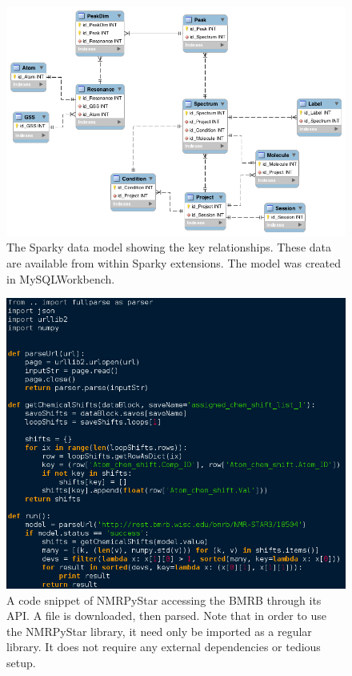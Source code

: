 \begin{figure}
  \includegraphics[scale=0.5]{figures/sparky_model}
  \caption[The Sparky data model]
          {The Sparky data model showing the key relationships.
           These data are available from within Sparky extensions.
           The model was created in MySQLWorkbench.}
  \label{sparky_model}
\end{figure}

\begin{figure}
  \includegraphics[scale=0.5]{figures/nmrpystar_bmrb}
  \caption[A code snippet of NMRPyStar]
          {A code snippet of NMRPyStar accessing the BMRB through its API.
           A file is downloaded, then parsed.  Note that in order to use
           the NMRPyStar library, it need only be imported as a regular
           library.  It does not require any external dependencies or
           tedious setup.}
  \label{nmrpystar_bmrb}
\end{figure}


